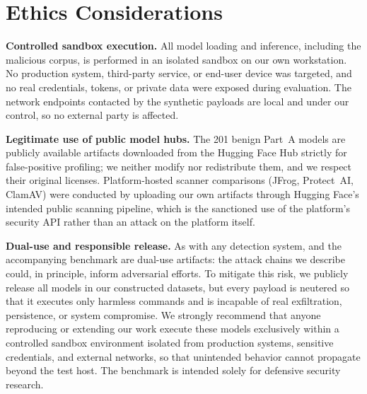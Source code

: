\section{Ethics Considerations}\label{sec:ethics}


\noindent \textbf{Controlled sandbox execution.} All model loading and inference, including the malicious corpus, is performed in an isolated sandbox on our own workstation. No production system, third-party service, or end-user device was targeted, and no real credentials, tokens, or private data were exposed during evaluation. The network endpoints contacted by the synthetic payloads are local and under our control, so no external party is affected.

\noindent \textbf{Legitimate use of public model hubs.} The 201 benign Part~A models are publicly available artifacts downloaded from the Hugging Face Hub strictly for false-positive profiling; we neither modify nor redistribute them, and we respect their original licenses. Platform-hosted scanner comparisons (JFrog, Protect~AI, ClamAV) were conducted by uploading our own artifacts through Hugging Face's intended public scanning pipeline, which is the sanctioned use of the platform's security API rather than an attack on the platform itself.

\noindent \textbf{Dual-use and responsible release.} As with any detection system, \toolname{} and the accompanying benchmark are dual-use artifacts: the attack chains we describe could, in principle, inform adversarial efforts. To mitigate this risk, we publicly release all models in our constructed datasets, but every payload is neutered so that it executes only harmless commands and is incapable of real exfiltration, persistence, or system compromise. We strongly recommend that anyone reproducing or extending our work execute these models exclusively within a controlled sandbox environment isolated from production systems, sensitive credentials, and external networks, so that unintended behavior cannot propagate beyond the test host. The benchmark is intended solely for defensive security research.
